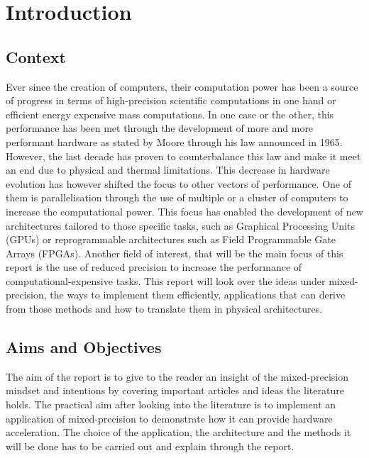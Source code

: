 \chapter{Introduction} %

\label{Chapter1} %



\section{Context}

Ever since the creation of computers, their computation power has been a source of progress in terms of high-precision scientific computations in one hand or efficient energy expensive mass computations. In one case or the other, this performance has been met through the development of more and more performant hardware as stated by Moore through his law announced in 1965. However, the last decade has proven to counterbalance this law and make it meet an end due to physical and thermal limitations. This decrease in hardware evolution has however shifted the focus to other vectors of performance. One of them is parallelisation through the use of multiple or a cluster of computers to increase the computational power. This focus has enabled the development of new architectures tailored to those specific tasks, such as Graphical Processing Units (GPUs) or reprogrammable architectures such as Field Programmable Gate Arrays (FPGAs). Another field of interest, that will be the main focus of this report is the use of reduced precision to increase the performance of computational-expensive tasks. This report will look over the ideas under mixed-precision, the ways to implement them efficiently, applications that can derive from those methods and how to translate them in physical architectures.

\section{Aims and Objectives}

The aim of the report is to give to the reader an insight of the mixed-precision mindset and intentions by covering important articles and ideas the literature holds. The practical aim after looking into the literature is to implement an application of mixed-precision to demonstrate how it can provide hardware acceleration. The choice of the application, the architecture and the methods it will be done has to be carried out and explain through the report.

